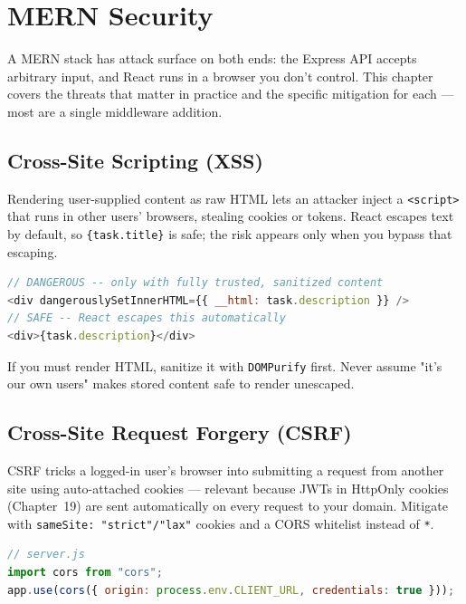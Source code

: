 \chapter{MERN Security}

A MERN stack has attack surface on both ends: the Express API accepts
arbitrary input, and React runs in a browser you don't control. This
chapter covers the threats that matter in practice and the specific
mitigation for each --- most are a single middleware addition.

\section{Cross-Site Scripting (XSS)}

Rendering user-supplied content as raw HTML lets an attacker inject a
\texttt{<script>} that runs in other users' browsers, stealing cookies or
tokens. React escapes text by default, so \texttt{\{task.title\}} is safe;
the risk appears only when you bypass that escaping.

\begin{lstlisting}[language=JavaScript]
// DANGEROUS -- only with fully trusted, sanitized content
<div dangerouslySetInnerHTML={{ __html: task.description }} />
// SAFE -- React escapes this automatically
<div>{task.description}</div>
\end{lstlisting}

\begin{warnbox}[WARNING]
If you must render HTML, sanitize it with \texttt{DOMPurify} first. Never
assume "it's our own users" makes stored content safe to render unescaped.
\end{warnbox}

\section{Cross-Site Request Forgery (CSRF)}

CSRF tricks a logged-in user's browser into submitting a request from
another site using auto-attached cookies --- relevant because JWTs in
HttpOnly cookies (Chapter~19) are sent automatically on every request to
your domain. Mitigate with \texttt{sameSite: "strict"/"lax"} cookies and a
CORS whitelist instead of \texttt{*}.

\begin{lstlisting}[language=JavaScript]
// server.js
import cors from "cors";
app.use(cors({ origin: process.env.CLIENT_URL, credentials: true }));
\end{lstlisting}

